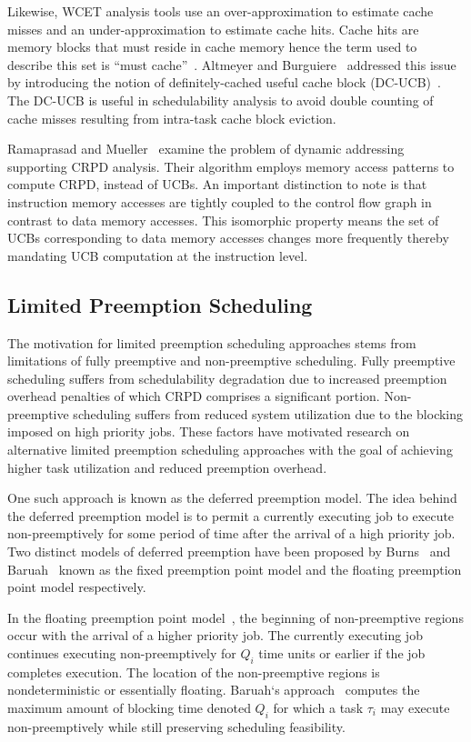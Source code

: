 Likewise, WCET analysis tools use an over-approximation to estimate cache misses and an under-approximation to estimate cache hits.  Cache hits are memory blocks that must reside in cache memory hence the term used to describe this set is “must cache”~\cite{altmeyer:11c}.  Altmeyer and Burguiere~\cite{altmeyer:11c} addressed this issue by introducing the notion of definitely-cached useful cache block (DC-UCB)~\cite{altmeyer:11c}.  The DC-UCB is useful in schedulability analysis to avoid double counting of cache misses resulting from intra-task cache block eviction.

Ramaprasad and Mueller~\cite{ramaprasad:06} examine the problem of dynamic addressing supporting CRPD analysis. Their algorithm employs memory access patterns to compute CRPD, instead of UCBs.  An important distinction to note is that instruction memory accesses are tightly coupled to the control flow graph in contrast to data memory accesses. This isomorphic property means the set of UCBs corresponding to data memory accesses changes more frequently thereby mandating UCB computation at the instruction level.
\subsection {Limited Preemption Scheduling}\label{sec:lp_related_work}
The motivation for limited preemption scheduling approaches stems from limitations of fully preemptive and non-preemptive scheduling.  Fully preemptive scheduling suffers from schedulability degradation due to increased preemption overhead penalties of which CRPD comprises a significant portion.  Non-preemptive scheduling suffers from reduced system utilization due to the blocking imposed on high priority jobs.  These factors have motivated research on alternative limited preemption scheduling approaches with the goal of achieving higher task utilization and reduced preemption overhead.

One such approach is known as the deferred preemption model.  The idea behind the deferred preemption model is to permit a currently executing job to execute non-preemptively for some period of time after the arrival of a high priority job.  Two distinct models of deferred preemption have been proposed by Burns~\cite{burns:05} and Baruah~\cite{baruah:05} known as the fixed preemption point model and the floating preemption point model respectively.

In the floating preemption point model~\cite{baruah:05}, the beginning of non-preemptive regions occur with the arrival of a higher priority job.  The currently executing job continues executing non-preemptively for \begin{math}Q_{i}\end{math} time units or earlier if the job completes execution. The location of the non-preemptive regions is nondeterministic or essentially floating. Baruah`s approach~\cite{baruah:05} computes the maximum amount of blocking time denoted \begin{math}Q_{i}\end{math} for which a task \begin{math}\tau_{i}\end{math} may execute non-preemptively while still preserving scheduling feasibility.

